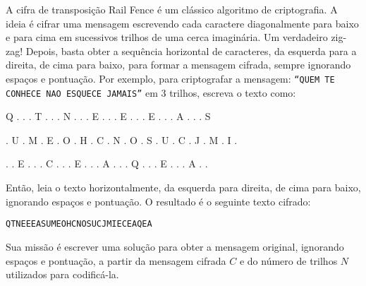A cifra de transposição Rail Fence é um clássico algoritmo de criptografia. A ideia é cifrar uma mensagem escrevendo cada caractere diagonalmente
para baixo e para cima em sucessivos trilhos de uma cerca imaginária.
Um verdadeiro zig-zag!
Depois, basta obter a sequência horizontal de caracteres, da esquerda para a direita, de cima para baixo, para formar a mensagem cifrada, sempre
ignorando espaços e pontuação.
Por exemplo, para criptografar a mensagem: \texttt{“QUEM TE CONHECE NAO ESQUECE JAMAIS”} em 3 trilhos, escreva o texto como:




\begin{center}
\small
\begin{verb} 
Q  .  .  .  T  .  .  .  N  .  .  .  E  .  .  .  E  .  .  .  E  .  .  .  A  .  .  .  S
\end{verb} 
\begin{verb}
.  U  .  M  .  E  .  O  .  H  .  C  .  N  .  O  .  S  .  U  .  C  .  J  .  M  .  I  . 
\end{verb} 
\begin{verb}
.  .  E  .  .  .  C  .  .  .  E  .  .  .  A  .  .  .  Q  .  .  .  E  .  .  .  A  .  . 
\end{verb}
\end{center}


\normalsize
Então, leia o texto horizontalmente, da esquerda para direita, de cima para baixo, ignorando espaços e pontuação. O resultado é o seguinte texto cifrado:

\begin{verbatim}
QTNEEEASUMEOHCNOSUCJMIECEAQEA
\end{verbatim}

Sua missão é escrever uma solução para obter a mensagem original, ignorando espaços e pontuação, a partir da mensagem cifrada $C$ e do número de trilhos
$N$ utilizados para codificá-la.

